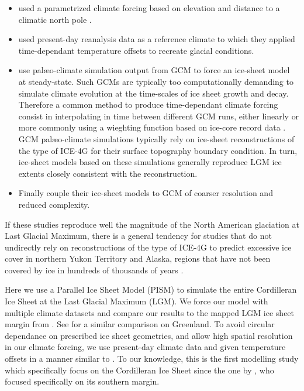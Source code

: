 \begin{itemize}

  \item \citet{johnson-fastook-2002} used a parametrized climate forcing based on elevation and distance to a climatic north pole \citep{fastook-prentice-1994}.

  \item \citet{bintanja-etal-2005} used present-day reanalysis data as a reference climate to which they applied time-dependant temperature offsets to recreate glacial conditions.

  \item \citet{huybrechts-tsiobbel-1996} use palæo-climate simulation output from GCM to force an ice-sheet model at steady-state. Such GCMs are typically too computationally demanding to simulate climate evolution at the time-scales of ice sheet growth and decay. Therefore a common method to produce time-dependant climate forcing consist in interpolating in time between different GCM runs, either linearly \citep{charbit-etal-2002} or more commonly using a wieghting function based on ice-core record data \citep{marshall-clarke-1999,tarasov-peltier-2004,zweck-huybrechts-2005,gregoire-etal-2012}. GCM palæo-climate simulations typically rely on ice-sheet reconstructions of the type of ICE-4G for their surface topography boundary condition. In turn, ice-sheet models based on these simulations generally reproduce LGM ice extents closely consistent with the reconstruction.

  \item Finally \citet{yoshimori-etal-2001,calov-etal-2002,abeouchi-etal-2007,charbit-etal-2013} couple their ice-sheet models to GCM of coarser resolution and reduced complexity.

\end{itemize}


If these studies reproduce well the magnitude of the North American glaciation at Last Glacial Maximum, there is a general tendency for studies that do not undirectly rely on reconstructions of the type of ICE-4G to predict excessive ice cover in northern Yukon Territory and Alaska, regions that have not been covered by ice in hundreds of thousands of years \citep{johnson-fastook-2002,bintanja-etal-2005,huybrechts-tsiobbel-1996,charbit-etal-2002,marshall-clarke-1999,tarasov-peltier-2004,zweck-huybrechts-2005,gregoire-etal-2012}.

Here we use a Parallel Ice Sheet Model (PISM) \citep{web:pism} to simulate the entire Cordilleran Ice Sheet at the Last Glacial Maximum (LGM). We force our model with multiple climate datasets and compare our results to the mapped LGM ice sheet margin from \citet{kleman-etal-2010}. See \citet{quiquet-etal-2012} for a similar comparison on Greenland. To avoid circular dependance on prescribed ice sheet geometries, and allow high spatial resolution in our climate forcing, we use present-day climate data and given temperature offsets in a manner similar to \citet{bintanja-etal-2005}. To our knowledge, this is the first modelling study which specifically focus on the Cordilleran Ice Sheet since the one by \citep{robert-1991}, who focused specifically on its southern margin.

